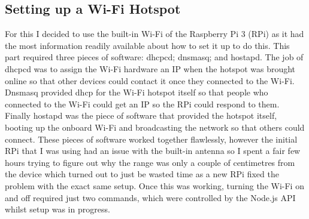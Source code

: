 \subsection{Setting up a Wi-Fi Hotspot}
For this I decided to use the built-in Wi-Fi of the Raspberry Pi 3 (RPi) as it had the most information readily available about how to set it up to do this. This part required three pieces of software: dhcpcd; dnsmasq; and hostapd. The job of dhcpcd was to assign the Wi-Fi hardware an IP when the hotspot was brought online so that other devices could contact it once they connected to the Wi-Fi. Dnsmasq provided dhcp for the Wi-Fi hotspot itself so that people who connected to the Wi-Fi could get an IP so the RPi could respond to them. Finally hostapd was the piece of software that provided the hotspot itself, booting up the onboard Wi-Fi and broadcasting the network so that others could connect. These pieces of software worked together flawlessly, however the initial RPi that I was using had an issue with the built-in antenna so I spent a fair few hours trying to figure out why the range was only a couple of centimetres from the device which turned out to just be wasted time as a new RPi fixed the problem with the exact same setup. Once this was working, turning the Wi-Fi on and off required just two commands, which were controlled by the Node.js API whilst setup was in progress.

